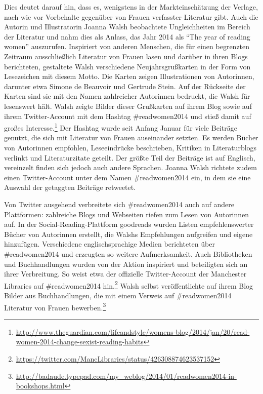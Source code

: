 \documentclass[a4paper,
fontsize=11pt,
oneside,
numbers=noperiodatend,
parskip=half-,
bibliography=totoc,
final
]{scrartcl}
\begin{document}
Dies deutet darauf hin, dass es, wenigstens in der Markteinschätzung der
Verlage, nach wie vor Vorbehalte gegenüber von Frauen verfasster
Literatur gibt. Auch die Autorin und Illustratorin Joanna Walsh
beobachtete Ungleichheiten im Bereich der Literatur und nahm dies als
Anlass, das Jahr 2014 als \enquote{The year of reading women}
auszurufen. Inspiriert von anderen Menschen, die für einen begrenzten
Zeitraum ausschließlich Literatur von Frauen lasen und darüber in ihren
Blogs berichteten, gestaltete Walsh verschiedene Neujahrsgrußkarten in
der Form von Lesezeichen mit diesem Motto. Die Karten zeigen
Illustrationen von Autorinnen, darunter etwa Simone de Beauvoir und
Gertrude Stein. Auf der Rückseite der Karten sind sie mit den Namen
zahlreicher Autorinnen bedruckt, die Walsh für lesenswert hält. Walsh
zeigte Bilder dieser Grußkarten auf ihrem Blog sowie auf ihrem
Twitter-Account mit dem Hashtag \#readwomen2014 und stieß damit auf
großes Interesse.\footnote{\url{http://www.theguardian.com/lifeandstyle/womens-blog/2014/jan/20/read-women-2014-change-sexist-reading-habits}}
Der Hashtag wurde seit Anfang Januar für viele Beiträge genutzt, die
sich mit Literatur von Frauen auseinander setzten. Es werden Bücher von
Autorinnen empfohlen, Leseeindrücke beschrieben, Kritiken in
Literaturblogs verlinkt und Literaturzitate geteilt. Der größte Teil der
Beiträge ist auf Englisch, vereinzelt finden sich jedoch auch andere
Sprachen. Joanna Walsh richtete zudem einen Twitter-Account unter dem
Namen \#readwomen2014 ein, in dem sie eine Auswahl der getaggten
Beiträge retweetet.

Von Twitter ausgehend verbreitete sich \#readwomen2014 auch auf andere
Plattformen: zahlreiche Blogs und Webseiten riefen zum Lesen von
Autorinnen auf. In der Social-Reading-Plattform goodreads wurden Listen
empfehlenswerter Bücher von Autorinnen erstellt, die Walshs Empfehlungen
aufgreifen und eigene hinzufügen. Verschiedene englischsprachige Medien
berichteten über \#readwomen2014 und erzeugten so weitere
Aufmerksamkeit. Auch Bibliotheken und Buchhandlungen wurden von der
Aktion inspiriert und beteiligten sich an ihrer Verbreitung. So weist
etwa der offizielle Twitter-Account der Manchester Libraries auf
\#readwomen2014 hin.\footnote{\url{https://twitter.com/MancLibraries/status/426308874623537152}}
Walsh selbst veröffentlichte auf ihrem Blog Bilder aus Buchhandlungen,
die mit einem Verweis auf \#readwomen2014 Literatur von Frauen
bewerben.\footnote{\url{http://badaude.typepad.com/my_weblog/2014/01/readwomen2014-in-bookshops.html}}
\end{document}
